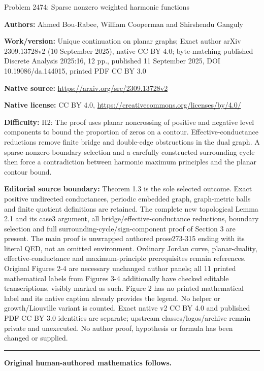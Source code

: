 \documentclass[10pt]{article}
\begin{document}
\begin{center}\Large Problem 2474: Sparse nonzero weighted harmonic functions\end{center}\noindent\textbf{Authors:} Ahmed Bou-Rabee, William Cooperman and Shirshendu Ganguly\par\noindent\textbf{Work/version:} Unique continuation on planar graphs; Exact author arXiv 2309.13728v2 (10 September 2025), native CC BY 4.0; byte-matching published Discrete Analysis 2025:16, 12 pp., published 11 September 2025, DOI 10.19086/da.144015, printed PDF CC BY 3.0\par\noindent\textbf{Native source:} \url{https://arxiv.org/src/2309.13728v2}\par\noindent\textbf{Native license:} CC BY 4.0, \url{https://creativecommons.org/licenses/by/4.0/}\par\noindent\textbf{Difficulty:} H2: The proof uses planar noncrossing of positive and negative level components to bound the proportion of zeros on a contour. Effective-conductance reductions remove finite bridge and double-edge obstructions in the dual graph. A sparse-nonzero boundary selection and a carefully constructed surrounding cycle then force a contradiction between harmonic maximum principles and the planar contour bound.\par\medskip\noindent\textbf{Editorial source boundary:} Theorem 1.3 is the sole selected outcome. Exact positive undirected conductances, periodic embedded graph, graph-metric balls and finite quotient definitions are retained. The complete new topological Lemma 2.1 and its case3 argument, all bridge/effective-conductance reductions, boundary selection and full surrounding-cycle/sign-component proof of Section 3 are present. The main proof is unwrapped authored prose273-315 ending with its literal QED, not an omitted environment. Ordinary Jordan curve, planar-duality, effective-conductance and maximum-principle prerequisites remain references. Original Figures 2-4 are necessary unchanged author panels; all 11 printed mathematical labels from Figures 3-4 additionally have checked editable transcriptions, visibly marked as such. Figure 2 has no printed mathematical label and its native caption already provides the legend. No helper or growth/Liouville variant is counted. Exact native v2 CC BY 4.0 and published PDF CC BY 3.0 identities are separate; upstream classes/logos/archive remain private and unexecuted. No author proof, hypothesis or formula has been changed or supplied.\par\medskip\hrule\medskip\noindent\textbf{Original human-authored mathematics follows.}\par
\end{document}
